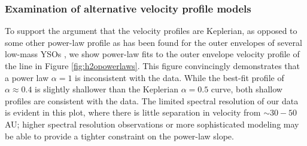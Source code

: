 \documentclass[twocolumn]{aastex62}
\newcommand{\sourcei}{SrcI\xspace}
\begin{document}
% 
% 

\subsubsection{Examination of alternative velocity profile models}
To support the argument that the velocity profiles are Keplerian, as opposed to
some other power-law profile as has been found for the outer envelopes of
several low-mass YSOs
\citep{Lee2017h,Aso2017b,Ohashi2014a,Lindberg2014a,Murillo2013a}, we show
power-law fits to the outer envelope velocity profile of the \water line
in Figure \ref{fig:h2opowerlaws}.
This figure convincingly demonstrates that
a power law $\alpha=1$ \citep[e.g., as observed in the outer parts of low-mass
YSO disks;][]{Aso2017b} is inconsistent with the data.  While the best-fit
profile of $\alpha\approx0.4$ is slightly shallower than the Keplerian
$\alpha=0.5$ curve, both shallow profiles are consistent with the data.
The limited spectral resolution of our data is evident in this plot, where
there is little separation in velocity from $\sim30-50$ AU; higher
spectral resolution observations or more sophisticated modeling may be able to
provide a tighter constraint on the power-law slope.
\end{document}
